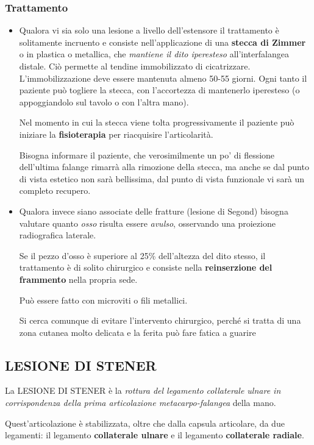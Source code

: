 \subsubsection{Trattamento}

\begin{itemize}
\item
  Qualora vi sia solo una lesione a livello dell'estensore il trattamento è solitamente incruento e consiste nell'applicazione di una \textbf{stecca di Zimmer} o in plastica o metallica, che \emph{mantiene il dito iperesteso} all'interfalangea distale.
Ciò permette al tendine immobilizzato di cicatrizzare.
L'immobilizzazione deve essere mantenuta almeno 50-55 giorni.
Ogni tanto il paziente può togliere la stecca, con l'accortezza di mantenerlo iperesteso (o appoggiandolo sul tavolo o con l'altra mano).


Nel momento in cui la stecca viene tolta progressivamente il paziente può iniziare la \textbf{fisioterapia} per riacquisire l'articolarità.

Bisogna informare il paziente, che verosimilmente un po' di flessione dell'ultima falange rimarrà alla rimozione della stecca, ma anche se dal punto di vista estetico non sarà bellissima, dal punto di vista funzionale vi sarà un completo recupero.

\item
  Qualora invece siano associate delle fratture (lesione di Segond) bisogna valutare quanto \emph{osso} risulta essere \emph{avulso}, osservando una proiezione radiografica laterale.

Se il pezzo d'osso è superiore al 25\% dell'altezza del dito stesso, il trattamento è di solito chirurgico e consiste nella \textbf{reinserzione del frammento} nella propria sede.

Può essere fatto con microviti o fili metallici.

Si cerca comunque di evitare l'intervento chirurgico, perché si tratta di una zona cutanea molto delicata e la ferita può fare fatica a guarire
\end{itemize}

\subsection{LESIONE DI STENER}

La LESIONE DI STENER è la \emph{rottura del legamento collaterale ulnare in corrispondenza della prima articolazione metacarpo-falangea} della
mano.

Quest'articolazione è stabilizzata, oltre che dalla capsula articolare, da due legamenti: il legamento \textbf{collaterale ulnare} e il legamento \textbf{collaterale radiale}.

